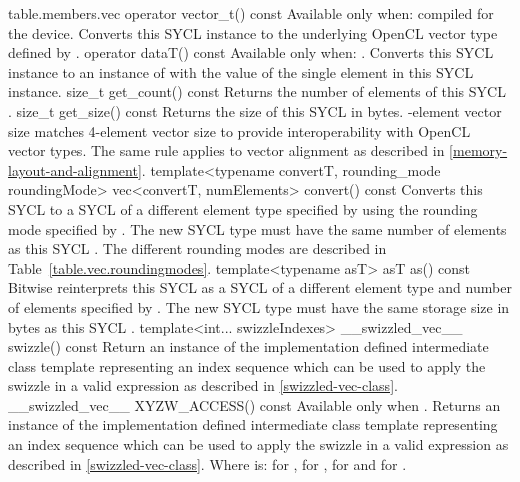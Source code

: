 {table.members.vec}
  \addRow
  {operator vector_t() const}
  {
    Available only when: compiled for the device.
    \newline
    Converts this SYCL  instance to the underlying OpenCL vector type
    defined by .
  }
  \addRow
  {operator dataT() const}
  {
    Available only when: .
    Converts this SYCL  instance to an instance of  with
    the value of the single element in this SYCL  instance.
  }
  \addRow
  {size_t get_count() const}
  {
    Returns the number of elements of this SYCL .
  }
  \addRow
  {size_t get_size() const}
  {
    Returns the size of this SYCL  in bytes.
    -element vector size matches 4-element vector size to provide
    interoperability with OpenCL vector types. The same rule applies to vector
    alignment as described in \ref{memory-layout-and-alignment}.
  }
  \addRowTwoL
  {template<typename convertT, rounding_mode roundingMode>}
  {vec<convertT, numElements> convert() const}
  {
    Converts this SYCL  to a SYCL  of a different element type specified by  using the rounding mode specified by . The new SYCL  type must have the same number of elements as this SYCL . The different rounding modes are described in Table~\ref{table.vec.roundingmodes}.
  }
  \addRowTwoL
  {template<typename asT>}
  {asT as() const}
  {
    Bitwise reinterprets this SYCL  as a SYCL  of a different element type and number of elements specified by . The new SYCL  type must have the same storage size in bytes as this SYCL .
  }
  \addRowTwoL
    { template<int... swizzleIndexes> }
    {\__swizzled_vec__ swizzle() const}
    {
      Return an instance of the implementation defined intermediate class template  representing an index sequence which can be used to apply the swizzle in a valid expression as described in \ref{swizzled-vec-class}.
    }
  \addRow
    {\__swizzled_vec__ XYZW_ACCESS() const}
    {
      Available only when .
      \newline \newline
      Returns an instance of the implementation defined intermediate class template  representing an index sequence which can be used to apply the swizzle in a valid expression as described in \ref{swizzled-vec-class}.
      \newline \newline
      Where  is:  for ,  for ,  for  and  for .
    }
